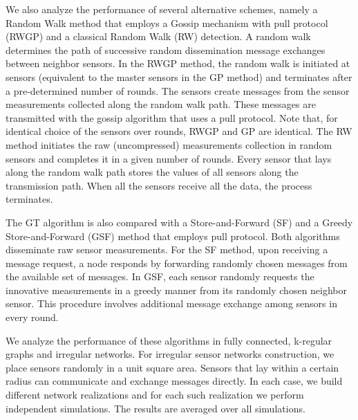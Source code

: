 \documentclass[journal]{IEEEtran}
\begin{document}
We also analyze the performance of several alternative schemes, namely a Random Walk method that employs a Gossip mechanism with pull protocol (RWGP) and a classical Random Walk (RW) detection. A random walk determines the path of successive random dissemination message exchanges between neighbor sensors. In the RWGP method, the random walk is initiated at  sensors (equivalent to the master sensors in the GP method) and terminates after a pre-determined number of rounds. The sensors create messages from the sensor measurements collected along the random walk path. These messages are transmitted with the gossip algorithm that uses a pull protocol. Note that, for identical choice of the sensors over rounds, RWGP and GP are identical. The RW method initiates the raw (uncompressed) measurements collection in  random sensors and completes it in a given number of rounds. Every sensor that lays along the random walk path stores the values of all sensors along the transmission path. When all the sensors receive all the data, the process terminates.

The GT algorithm is also compared with a Store-and-Forward (SF) and a Greedy Store-and-Forward (GSF) method that employs pull protocol. Both algorithms disseminate raw sensor measurements. For the SF method, upon receiving a message request, a node responds by forwarding randomly chosen messages from the available set of messages. In GSF, each sensor randomly requests the innovative measurements in a greedy manner from its randomly chosen neighbor sensor. This procedure involves additional message exchange among sensors in every round. 

We analyze the performance of these algorithms in fully connected, k-regular graphs and irregular networks. For irregular sensor networks construction, we place sensors randomly in a unit square area. Sensors that lay within a certain radius can communicate and exchange messages directly. In each case, we build  different network realizations and for each such realization we perform  independent simulations. The results are averaged over all simulations. 
\end{document}
